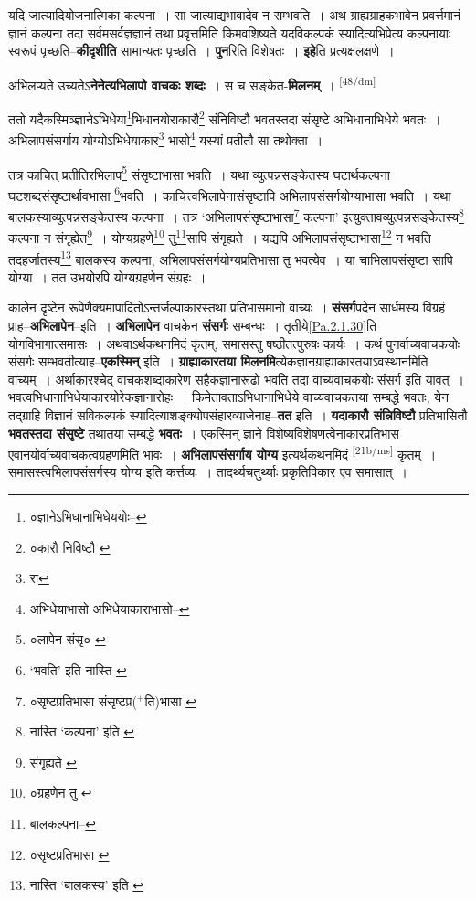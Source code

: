 \documentclass[article,12pt,a4paper]{memoir}
\newcommand{\add}[1]{($^{+}$#1)}
\begin{document}
	  \pstart यदि जात्यादियोजनात्मिका कल्पना । सा जात्याद्यभावादेव न सम्भवति । अथ ग्राह्यग्राहकभावेन प्रवर्त्तमानं ज्ञानं कल्पना तदा सर्वमसर्वज्ञज्ञानं तथा प्रवृत्तमिति किमवशिष्यते यदविकल्पकं स्यादित्यभिप्रेत्य कल्पनायाः स्वरूपं पृच्छति--\textbf{कीदृशीति} सामान्यतः पृच्छति । \textbf{पुन}रिति विशेषतः । \textbf{इहे}ति प्रत्यक्षलक्षणे ।
	\pend
      

	  \pstart अभिलप्यते उच्यतेऽ\textbf{नेनेत्यभिलापो वाचकः शब्दः} । स च सङ्केत-\textbf{मिलनम्} ।
	\pend
      \leavevmode\textsuperscript{\rmlatinfont\tiny [48/dm]}

	  \pstart ततो यदैकस्मिञ्ज्ञानेऽभिधेया\footnote{०ज्ञानेऽभिधानाभिधेययोः--\cite{dp-msB}}भिधानयोराकारौ\footnote{०कारौ निविष्टौ \cite{dp-msB}} संनिविष्टौ भवतस्तदा संसृष्टे अभिधानाभिधेये भवतः । अभिलापसंसर्गाय योग्योऽभिधेयाकार\footnote{रा} भासो\footnote{अभिधेयाभासो \cite{dp-msA} \cite{dp-edP} \cite{dp-edH} \cite{dp-edE} अभिधेयाकाराभासो--\cite{dp-edN}} यस्यां प्रतीतौ सा तथोक्ता ।
	\pend
       

	  \pstart तत्र काचित् प्रतीतिरभिलाप\footnote{०लापेन संसृ० \cite{dp-msA} \cite{dp-edP} \cite{dp-edH} \cite{dp-edE} \cite{dp-edN}} संसृष्टाभासा भवति । यथा व्युत्पन्नसङ्केतस्य घटार्थकल्पना घटशब्दसंसृष्टार्थावभासा \footnote{‘भवति’ इति नास्ति \cite{dp-msB} \cite{dp-msD}}भवति । काचित्त्वभिलापेनासंसृष्टापि अभिलापसंसर्गयोग्याभासा भवति । यथा बालकस्याव्युत्पन्नसङ्केतस्य कल्पना । तत्र ‘अभिलापसंसृष्टाभासा\footnote{०सृष्टप्रतिभासा \cite{dp-msD} संसृष्टप्र\add{ति}भासा \cite{dp-msB}} कल्पना’ इत्युक्तावव्युत्पन्नसङ्केतस्य\footnote{नास्ति ‘कल्पना’ इति \cite{dp-msA} \cite{dp-msB} \cite{dp-edP} \cite{dp-edH} \cite{dp-edE} \cite{dp-edN}} कल्पना न संगृह्येत\footnote{संगृह्यते \cite{dp-msC}} । योग्यग्रहणे\footnote{०ग्रहणेन तु \cite{dp-msC}} तु\footnote{बालकल्पना--\cite{dp-msD-n}}सापि संगृह्यते । यद्यपि अभिलापसंसृष्टाभासा\footnote{०सृष्टप्रतिभासा \cite{dp-msC} \cite{dp-msA}} न भवति तदहर्जातस्य\footnote{नास्ति ‘बालकस्य’ इति \cite{dp-msA} \cite{dp-edP} \cite{dp-edE}} बालकस्य कल्पना, अभिलापसंसर्गयोग्यप्रतिभासा तु भवत्येव । या चाभिलापसंसृष्टा सापि योग्या । तत उभयोरपि योग्यग्रहणेन संग्रहः ।
	\pend
      

	  \pstart कालेन दृष्टेन रूपेणैक्यमापादितोऽन्तर्जल्पाकारस्तथा प्रतिभासमानो वाच्यः । \textbf{संसर्ग}पदेन सार्धमस्य विग्रहं प्राह--\textbf{अभिलापेन}--इति । \textbf{अभिलापेन} वाचकेन \textbf{संसर्गः} सम्बन्धः । तृतीये\cref{Pā.2.1.30}ति योगविभागात्समासः । अथवाऽर्थकथनमिदं कृतम्, समासस्तु षष्ठीतत्पुरुषः कार्यः । कथं पुनर्वाच्यवाचकयोः संसर्गः सम्भवतीत्याह--\textbf{एकस्मिन्} इति । \textbf{ग्राह्याकारतया मिलनमि}त्येकज्ञानग्राह्याकारतयाऽवस्थानमिति वाच्यम् । अर्थाकारश्चेद् वाचकशब्दाकारेण सहैकज्ञानारूढो भवति तदा वाच्यवाचकयोः संसर्ग इति यावत् । भवत्वभिधानाभिधेयाकारयोरेकज्ञानारोहः । किमेतावताऽभिधानाभिधेये वाच्यवाचकतया सम्बद्धे भवतः, येन तद्ग्राहि विज्ञानं सविकल्पकं स्यादित्याशङ्क्योपसंहारव्याजेनाह--\textbf{तत} इति । \textbf{यदाकारौ संन्निविष्टौ} प्रतिभासितौ \textbf{भवतस्तदा संसृष्टे} तथातया सम्बद्धे \textbf{भवतः} । एकस्मिन् ज्ञाने विशेष्यविशेषणत्वेनाकारप्रतिभास एवानयोर्वाच्यवाचकत्वग्रहणमिति भावः । \textbf{अभिलापसंसर्गाय योग्य} इत्यर्थकथनमिदं \leavevmode\textsuperscript{\rmlatinfont\tiny [21b/ms]} कृतम् । समासस्त्वभिलापसंसर्गस्य योग्य इति कर्त्तव्यः । तादर्थ्यचतुर्थ्याः प्रकृतिविकार एव समासात् ।
	\pend
      
\end{document}
